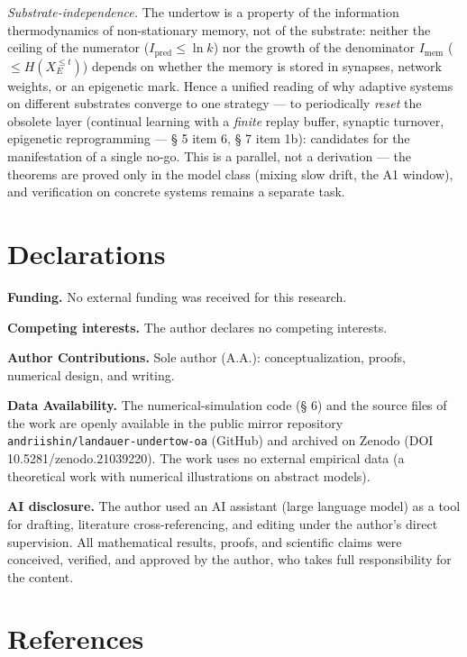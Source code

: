 \documentclass[12pt]{iopart}
\begin{document}
\emph{Substrate-independence.} The undertow is a property of the information thermodynamics of non-stationary memory, not of the substrate: neither the ceiling of the numerator (\(I_{\text{pred}} \le \ln k\)) nor the growth of the denominator \(I_{\text{mem}}\) (\(\le H(X_E^{\le t})\)) depends on whether the memory is stored in synapses, network weights, or an epigenetic mark. Hence a unified reading of why adaptive systems on different substrates converge to one strategy --- to periodically \emph{reset} the obsolete layer (continual learning with a \emph{finite} replay buffer, synaptic turnover, epigenetic reprogramming --- § 5 item 6, § 7 item 1b): candidates for the manifestation of a single no-go. This is a parallel, not a derivation --- the theorems are proved only in the model class (mixing slow drift, the A1 window), and verification on concrete systems remains a separate task.



\section*{Declarations}
\textbf{Funding.} No external funding was received for this research.



\textbf{Competing interests.} The author declares no competing interests.



\textbf{Author Contributions.} Sole author (A.A.): conceptualization, proofs, numerical design, and writing.



\textbf{Data Availability.} The numerical-simulation code (§ 6) and the source files of the work are openly available in the public mirror repository \texttt{andriishin/landauer-undertow-oa} (GitHub) and archived on Zenodo (DOI 10.5281/zenodo.21039220). The work uses no external empirical data (a theoretical work with numerical illustrations on abstract models).



\textbf{AI disclosure.} The author used an AI assistant (large language model) as a tool for drafting, literature cross-referencing, and editing under the author's direct supervision. All mathematical results, proofs, and scientific claims were conceived, verified, and approved by the author, who takes full responsibility for the content.




\section*{References}


\end{document}
